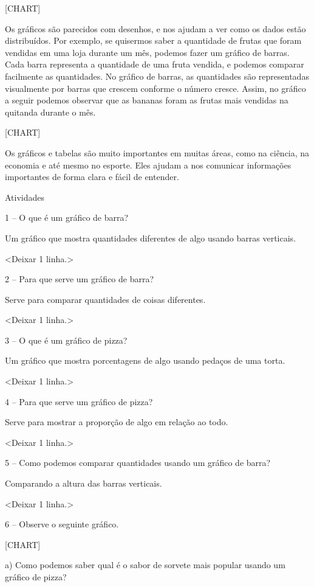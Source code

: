 {{[}CHART{]}}

Os gráficos são parecidos com desenhos, e nos ajudam a ver como os dados
estão distribuídos. Por exemplo, se quisermos saber a quantidade de
frutas que foram vendidas em uma loja durante um mês, podemos fazer um
gráfico de barras. Cada barra representa a quantidade de uma fruta
vendida, e podemos comparar facilmente as quantidades. No gráfico de
barras, as quantidades são representadas visualmente por barras que
crescem conforme o número cresce. Assim, no gráfico a seguir podemos
observar que as bananas foram as frutas mais vendidas na quitanda
durante o mês.

{{[}CHART{]}}

Os gráficos e tabelas são muito importantes em muitas áreas, como na
ciência, na economia e até mesmo no esporte. Eles ajudam a nos comunicar
informações importantes de forma clara e fácil de entender.

Atividades

1 -- O que é um gráfico de barra?

Um gráfico que mostra quantidades diferentes de algo usando barras
verticais.

\textless{}Deixar 1 linha.\textgreater{}

2 -- Para que serve um gráfico de barra?

Serve para comparar quantidades de coisas diferentes.

\textless{}Deixar 1 linha.\textgreater{}

3 -- O que é um gráfico de pizza?

Um gráfico que mostra porcentagens de algo usando pedaços de uma torta.

\textless{}Deixar 1 linha.\textgreater{}

4 -- Para que serve um gráfico de pizza?

Serve para mostrar a proporção de algo em relação ao todo.

\textless{}Deixar 1 linha.\textgreater{}

5 -- Como podemos comparar quantidades usando um gráfico de barra?

Comparando a altura das barras verticais.

\textless{}Deixar 1 linha.\textgreater{}

6 -- Observe o seguinte gráfico.

{{[}CHART{]}}

a) Como podemos saber qual é o sabor de sorvete mais popular usando um
gráfico de pizza?

